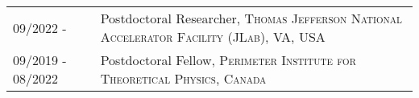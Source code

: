 \vspace*{-1.6cm}
\begin{longtable}{R{3.3cm}|p{14.8cm}}
	09/2022 -  & Postdoctoral Researcher, \textsc{Thomas Jefferson National Accelerator Facility (JLab), VA, USA} \\
 	09/2019 - 08/2022 & Postdoctoral Fellow, \textsc{Perimeter Institute for Theoretical Physics, Canada} \\
\end{longtable}
